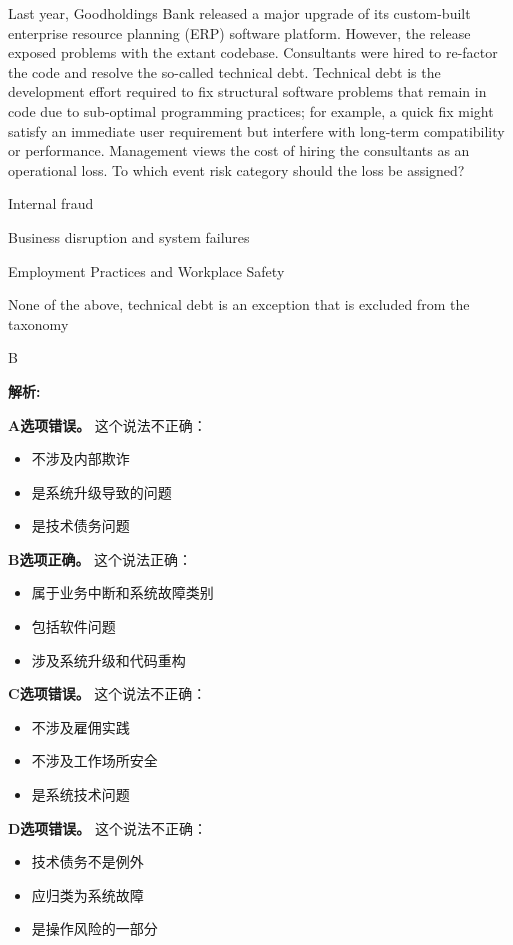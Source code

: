 \documentclass{article}
\newcounter{question} %
\newenvironment{explanation}
{\textbf{解析:}\par}
{\par}
\begin{document}
\begin{question}
    Last year, Goodholdings Bank released a major upgrade of its custom-built enterprise resource planning (ERP) software platform. However, the release exposed problems with the extant codebase. Consultants were hired to re-factor the code and resolve the so-called technical debt. Technical debt is the development effort required to fix structural software problems that remain in code due to sub-optimal programming practices; for example, a quick fix might satisfy an immediate user requirement but interfere with long-term compatibility or performance. Management views the cost of hiring the consultants as an operational loss. To which event risk category should the loss be assigned?
\end{question}

\begin{choices}
    \item Internal fraud
    \item Business disruption and system failures
    \item Employment Practices and Workplace Safety
    \item None of the above, technical debt is an exception that is excluded from the taxonomy
\end{choices}

\begin{correctanswer}
    B
\end{correctanswer}

\begin{explanation}
    \textbf{A选项错误。}
    这个说法不正确：
    \begin{itemize}
        \item 不涉及内部欺诈
        \item 是系统升级导致的问题
        \item 是技术债务问题
    \end{itemize}

    \textbf{B选项正确。}
    这个说法正确：
    \begin{itemize}
        \item 属于业务中断和系统故障类别
        \item 包括软件问题
        \item 涉及系统升级和代码重构
    \end{itemize}

    \textbf{C选项错误。}
    这个说法不正确：
    \begin{itemize}
        \item 不涉及雇佣实践
        \item 不涉及工作场所安全
        \item 是系统技术问题
    \end{itemize}

    \textbf{D选项错误。}
    这个说法不正确：
    \begin{itemize}
        \item 技术债务不是例外
        \item 应归类为系统故障
        \item 是操作风险的一部分
    \end{itemize}
\end{explanation}
\end{document}
